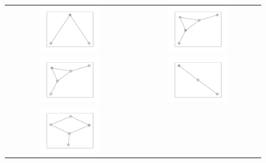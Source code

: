 \documentclass[12pt, a4paper]{extarticle}
\begin{document}
\begin{figure}\centering\begin{tabularx}{\textwidth}{cc}
\includegraphics[width=0.5\textwidth]{task11-graphlets/3_21-18-23.pdf} &
\includegraphics[width=0.5\textwidth]{task11-graphlets/5_18-25-23-24-26.pdf} \\
\includegraphics[width=0.5\textwidth]{task11-graphlets/5_25-22-23-24-26.pdf} &
\includegraphics[width=0.5\textwidth]{task11-graphlets/3_25-23-26.pdf} \\
\includegraphics[width=0.5\textwidth]{task11-graphlets/5_16-21-18-22-23.pdf} &

\end{tabularx}
\end{figure}
\end{document}
